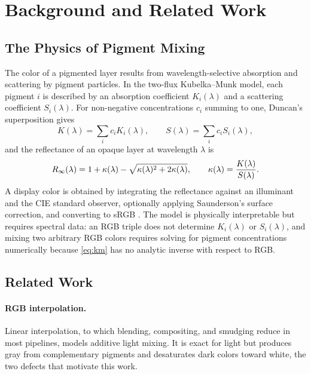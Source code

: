 \section{Background and Related Work}
\label{sec:background}

\subsection{The Physics of Pigment Mixing}
\label{sec:km}

The color of a pigmented layer results from wavelength-selective absorption and scattering by pigment particles. In the two-flux Kubelka--Munk model, each pigment $i$ is described by an absorption coefficient $K_i(\lambda)$ and a scattering coefficient $S_i(\lambda)$. For non-negative concentrations $c_i$ summing to one, Duncan's superposition gives
\begin{equation}
K(\lambda)=\sum_i c_i K_i(\lambda),\qquad
S(\lambda)=\sum_i c_i S_i(\lambda),
\label{eq:duncan}
\end{equation}
and the reflectance of an opaque layer at wavelength $\lambda$ is
\begin{equation}
R_{\infty}(\lambda)=1+\kappa(\lambda)-\sqrt{\kappa(\lambda)^{2}+2\kappa(\lambda)},
\qquad \kappa(\lambda)=\frac{K(\lambda)}{S(\lambda)}.
\label{eq:km}
\end{equation}
A display color is obtained by integrating the reflectance against an illuminant and the CIE standard observer, optionally applying Saunderson's surface correction, and converting to sRGB \cite{saunderson1942,haase1992,wyszecki2000}. The model is physically interpretable but requires spectral data: an RGB triple does not determine $K_i(\lambda)$ or $S_i(\lambda)$, and mixing two arbitrary RGB colors requires solving for pigment concentrations numerically because \cref{eq:km} has no analytic inverse with respect to RGB.

\subsection{Related Work}
\label{sec:related}

\paragraph{RGB interpolation.}
Linear interpolation, to which blending, compositing, and smudging reduce in most pipelines, models additive light mixing. It is exact for light but produces gray from complementary pigments and desaturates dark colors toward white, the two defects that motivate this work.

